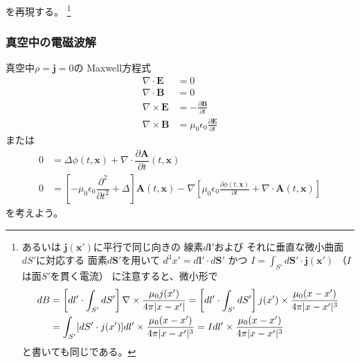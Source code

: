 を再現する。
\footnote{
  あるいは
  $\bm{j}(\bm{x}')$に平行で同じ向きの
  線素$d \bm{l}'$および
  それに垂直な微小曲面$dS'$に対応する
  面素$d \bm{S}'$を用いて
  $d^3 x' = d \bm{l}' \cdot d \bm{S}'$
  かつ
  $I = \int_{S'} d \bm{S}' \cdot \bm{j}(\bm{x}')$
  （$I$は面$S'$を貫く電流）
  に注意すると、微小形で
  \begin{align}
    d B
  &=
    \left[
      d l' \cdot
      \int_{S'} d S'
    \right]
    \nabla \times
      \dfrac{
        \mu_0 j (x')
      }{
        4 \pi
        |x - x'|
      }
  =
    \left[
      d l' \cdot
      \int_{S'} d S'
    \right]
    j (x') \times
      \dfrac{
        \mu_0
        (x - x')
      }{
        4 \pi
        |x - x'|^3
      }
  \notag\\&
  =
    \int_{S'}
      [d S' \cdot j (x')]
    d l' \times
      \dfrac{
        \mu_0
        (x - x')
      }{
        4 \pi
        |x - x'|^3
      }
  =
    I d l'
    \times
      \dfrac{
        \mu_0
        (x - x')
      }{
        4 \pi
        |x - x'|^3
      }
  \end{align}
  と書いても同じである。
}

\subsubsection{真空中の電磁波解}

真空中$\rho = \bm{j} = 0$の
Maxwell方程式
\begin{subequations}
\begin{align}
  \nabla \cdot \bm{E}
&=
  0
\\
  \nabla \cdot \bm{B}
&= 0
\\
  \nabla \times \bm{E}
&=
  - \frac{\partial \bm{B}}
    {\partial t}
\\
  \nabla \times \bm{B}
&=
  \mu_0 \epsilon_0
    \frac{\partial \bm{E}}
      {\partial t}
\end{align}
\end{subequations}
または
\begin{subequations}
\begin{align}
  0
&=
    \Delta \phi (t, \bm{x})
  +
    \nabla \cdot
    \dfrac{\partial \bm{A}}
      {\partial t} (t, \bm{x})
\\
  0
&=
  \left[
    - \mu_0 \epsilon_0
    \dfrac{\partial^2}{\partial t^2}
  +
    \Delta
  \right]
    \bm{A} (t, \bm{x})
  -
  \nabla
  \left[
    \mu_0 \epsilon_0
    \frac{\partial \phi (t, \bm{x})}
      {\partial t}
  +
    \nabla \cdot
      \bm{A} (t, \bm{x})
  \right]
\end{align}
\label{maxwell eq of potentials in vacuum}
\end{subequations}
を考えよう。

